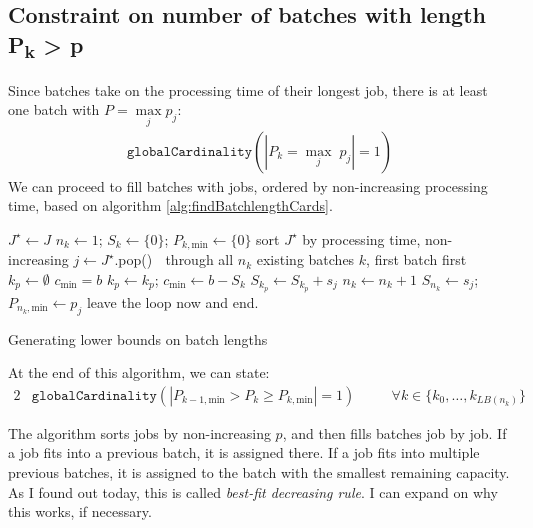 \documentclass[13pt, letterpaper, twoside]{book}
\begin{document}
\subsection{Constraint on number of batches with length
{\sansitalicfont P\textsubscript{k}} > {\sansitalicfont p}}

Since batches take on the processing time of their longest job, there is at
least one batch with $P = \underset{j}{\max} p_j $:
\begin{align}
\mathtt{globalCardinality}( |P_k = \underset{j}{\max} \; p_j| = 1 ) 
\end{align}
We can proceed to fill batches with jobs, ordered by non-increasing processing
time, based on algorithm \ref{alg:findBatchlengthCards}.
\begin{algorithm}
\fontsize{9pt}{11.5pt}\selectfont
\begin{algorithmic}
\State $J^{\star} \gets J$ 
\State $n_k \gets 1$; $S_k \gets \{0\}$; $P_{k,\text{min}} \gets \{0\}$ 
\State sort $J^{\star}$ by processing time, non-increasing
\Repeat
  \State $j \gets J^{\star}$.pop() 
  \Loop $\;$ through all $n_k$ existing batches $k$, first batch first
    \State $k_p \gets \emptyset$ 
    \State $c_\text{min} = b$ 
      \State $k_p \gets k_p$; $c_\text{min} \gets b-S_k$
    \EndIf
  \EndLoop
      \State $S_{k_p} \gets S_{k_p} + s_j$ 
  \Else
      \State $n_k \gets n_k + 1$
      \State $S_{n_k} \gets s_j$; $P_{n_k,\text{min}} \gets p_j$ 
    \Else
      \State leave the loop now and end.
    \EndIf
  \EndIf
{}
\end{algorithmic}
\caption{Generating lower bounds on batch lengths}
\label{alg:findBatchlengthCards}
\end{algorithm}

At the end of this algorithm, we can state:
\begin{alignat}{2}
& \mathtt{globalCardinality}( |P_{k-1,\text{min}} > P_k \geq P_{k,\text{min}} | =
1) \quad && \forall k \in \{k_0,\dots,k_{LB(n_k)}\}
\end{alignat}

The algorithm sorts jobs by non-increasing $p$, and then fills batches job by
job. If a job fits into a previous batch, it is assigned there. If a job fits
into multiple previous batches, it is assigned to the batch with the smallest
remaining capacity. {\color{darkred} As I found out today, this is called
\textit{best-fit decreasing rule}. I can expand on why this works, if
necessary.}
\end{document}
